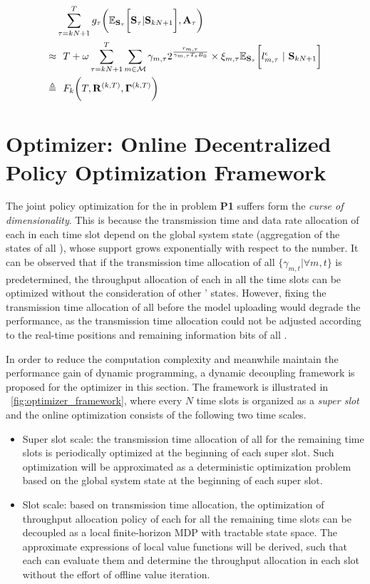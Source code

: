 \begin{align}
    &\sum_{\tau=kN+1}^{T} g_{\tau}\bigg(
        \mathbb{E}_{\mathbf{S}_{\tau}} \bigg[ \mathbf{S}_{\tau} | \mathbf{S}_{kN+1} \bigg], \mathbf{A}_{\tau}
    \bigg)
    \nonumber\\
    \approx&~~T + \omega \sum_{\tau=kN+1}^{T} \sum_{m\in\mathcal{M}} \gamma_{m,\tau}
    2^\frac{r_{m,\tau}}{\gamma_{m,\tau}T_s B_0} 
    \times \xi_{m,\tau} \mathbb{E}_{\mathbf{S}_{\tau}} \bigg[ l_{m,\tau}^{\epsilon}~|~\mathbf{S}_{kN+1} \bigg]
    \nonumber\\
    \triangleq&~~F_k\bigg( T, \mathbf{R}^{(k,T)}, \mathbf{\Gamma}^{(k,T)} \bigg)
    \label{eqn:fk}
\end{align}

\section{{\fwName} Optimizer: Online Decentralized Policy Optimization Framework}
\label{sec:chapter2-new_framework}

The joint policy optimization for the {\IAVs} in problem {\bf P1} suffers form the {\it curse of dimensionality}. This is because the transmission time and data rate allocation of each {\IAV} in each time slot depend on the global system state (aggregation of the states of all {\IAVs}), whose support grows exponentially with respect to the {\IAV} number.
It can be observed that if the transmission time allocation of all {\IAVs} $\{\gamma_{m,t}|\forall m,t\}$ is predetermined, the throughput allocation of each {\IAV} in all the time slots can be optimized without the consideration of other {\IAVs}' states.
However, fixing the transmission time allocation of all {\IAVs} before the model uploading would degrade the performance, as the transmission time allocation could not be adjusted according to the real-time positions and remaining information bits of all {\IAVs}.

In order to reduce the computation complexity and meanwhile maintain the performance gain of dynamic programming, a dynamic decoupling framework is proposed for the {\fwName} optimizer in this section. The framework is illustrated in \figurename~\ref{fig:optimizer_framework}, where every $N$ time slots is organized as a {\it super slot} and the online optimization consists of the following two time scales.
\begin{itemize}
    \item Super slot scale: the transmission time allocation of all {\IAVs} for the remaining time slots is periodically optimized at the beginning of each super slot. Such optimization will be approximated as a deterministic optimization problem based on the global system state at the beginning of each super slot.
    \item Slot scale: based on transmission time allocation, the optimization of throughput allocation policy of each {\IAV} for all the remaining time slots can be decoupled as a local finite-horizon MDP with tractable state space. The approximate expressions of local value functions will be derived, such that each {\IAV} can evaluate them and determine the throughput allocation in each slot without the effort of offline value iteration.
\end{itemize}

